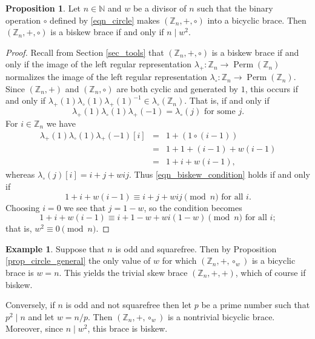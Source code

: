 \documentclass[reqno]{amsart}
\theoremstyle{definition}
\newtheorem{proposition}[theorem]{Proposition}
\newtheorem{example}[theorem]{Example}
\newcommand{\Z}{\mathbb{Z}}
\newcommand{\N}{\mathbb{N}}
\DeclareMathOperator{\Perm}{\mbox{Perm}}
\begin{document}
\begin{proposition} \label{prop_biskew_general}
Let $ n \in \N $ and $ w $ be a divisor of $ n $ such that the binary operation $ \circ $ defined by \eqref{eqn_circle} makes $ (\Z_{n},+,\circ) $ into a bicyclic brace. Then $ (\Z_{n},+,\circ) $ is a biskew brace if and only if $ n \mid w^{2} $.  
\end{proposition}
\begin{proof}
Recall from Section \ref{sec_tools} that $ (\Z_{n},+,\circ) $ is a biskew brace if and only if the image of the left regular representation $ \lambda_{+} : \Z_{n} \rightarrow \Perm(\Z_{n}) $ normalizes the image of the left regular representation $ \lambda_{\circ} : \Z_{n} \rightarrow \Perm(\Z_{n}) $. Since $ (\Z_{n},+) $ and $ (\Z_{n},\circ) $ are both cyclic and generated by $ 1 $, this occurs if and only if $ \lambda_{+}(1) \lambda_{\circ}(1) \lambda_{+}(1)^{-1} \in \lambda_{\circ}(\Z_{n}) $. That is, if and only if 
\begin{equation} \label{eqn_biskew_condition}
\lambda_{+}(1) \lambda_{\circ}(1) \lambda_{+}(-1) = \lambda_{\circ}(j) \mbox{ for some } j.
\end{equation}
For $ i \in \Z_{n} $ we have
\begin{eqnarray*}
\lambda_{+}(1) \lambda_{\circ}(1) \lambda_{+}(-1) [i] & = & 1+( 1 \circ (i-1) ) \\
& = & 1 + 1+(i-1)+w(i-1) \\
& = & 1+i+w(i-1),
\end{eqnarray*}
whereas $ \lambda_{\circ}(j)[i] = i+j+wij $. Thus \eqref{eqn_biskew_condition} holds if and only if 
\[ 1+i+w(i-1) \equiv i+j+wij \pmod{n} \mbox{ for all } i. \]
Choosing $ i=0 $ we see that $ j=1-w $, so the condition becomes 
\[ 1+i+w(i-1) \equiv i+1-w+wi(1-w) \pmod{n} \mbox{ for all } i; \]
that is, $ w^{2} \equiv 0 \pmod{n} $. 
\end{proof}

\begin{example}
Suppose that $ n $ is odd and squarefree. Then by Proposition \ref{prop_circle_general} the only value of $ w $ for which $ (\Z_{n},+,\circ_{w}) $ is a bicyclic brace is $ w=n $. This yields the trivial skew brace $ (\Z_{n},+,+) $, which of course if biskew. 

Conversely, if $ n $ is odd and not squarefree then let $ p $ be a prime number such that $ p^{2} \mid n $ and let $ w = n/p $. Then $ (\Z_{n},+,\circ_{w}) $ is a nontrivial bicyclic brace. Moreover, since $ n \mid w^{2} $, this brace is biskew. 
\end{example}
\end{document}

